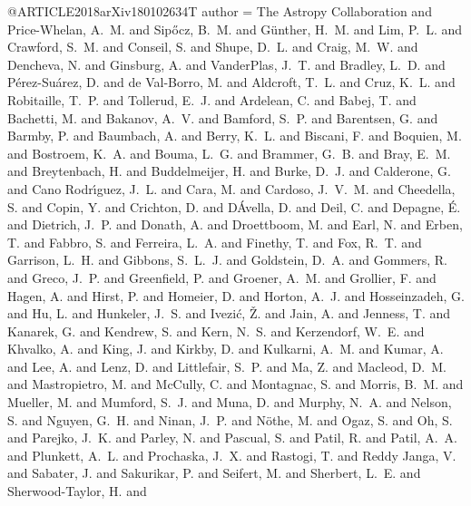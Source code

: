 @ARTICLE{2018arXiv180102634T
   author = {{The Astropy Collaboration} and {Price-Whelan}, A.~M. and {Sip{\H o}cz}, B.~M. and
        {G{\"u}nther}, H.~M. and {Lim}, P.~L. and {Crawford}, S.~M. and
        {Conseil}, S. and {Shupe}, D.~L. and {Craig}, M.~W. and {Dencheva}, N. and
        {Ginsburg}, A. and {VanderPlas}, J.~T. and {Bradley}, L.~D. and 
        {P{\'e}rez-Su{\'a}rez}, D. and {de Val-Borro}, M. and {Aldcroft}, T.~L. and 
        {Cruz}, K.~L. and {Robitaille}, T.~P. and {Tollerud}, E.~J. and
        {Ardelean}, C. and {Babej}, T. and {Bachetti}, M. and {Bakanov}, A.~V. and 
        {Bamford}, S.~P. and {Barentsen}, G. and {Barmby}, P. and {Baumbach}, A. and 
        {Berry}, K.~L. and {Biscani}, F. and {Boquien}, M. and {Bostroem}, K.~A. and 
        {Bouma}, L.~G. and {Brammer}, G.~B. and {Bray}, E.~M. and {Breytenbach}, H. and
        {Buddelmeijer}, H. and {Burke}, D.~J. and {Calderone}, G. and 
        {Cano Rodr{\'{\i}}guez}, J.~L. and {Cara}, M. and {Cardoso}, J.~V.~M. and 
        {Cheedella}, S. and {Copin}, Y. and {Crichton}, D. and {D{\'A}vella}, D. and
        {Deil}, C. and {Depagne}, {\'E}. and {Dietrich}, J.~P. and {Donath}, A. and 
        {Droettboom}, M. and {Earl}, N. and {Erben}, T. and {Fabbro}, S. and 
        {Ferreira}, L.~A. and {Finethy}, T. and {Fox}, R.~T. and {Garrison}, L.~H. and 
        {Gibbons}, S.~L.~J. and {Goldstein}, D.~A. and {Gommers}, R. and 
        {Greco}, J.~P. and {Greenfield}, P. and {Groener}, A.~M. and 
        {Grollier}, F. and {Hagen}, A. and {Hirst}, P. and {Homeier}, D. and 
        {Horton}, A.~J. and {Hosseinzadeh}, G. and {Hu}, L. and {Hunkeler}, J.~S. and 
        {Ivezi{\'c}}, {\v Z}. and {Jain}, A. and {Jenness}, T. and {Kanarek}, G. and 
        {Kendrew}, S. and {Kern}, N.~S. and {Kerzendorf}, W.~E. and 
        {Khvalko}, A. and {King}, J. and {Kirkby}, D. and {Kulkarni}, A.~M. and 
        {Kumar}, A. and {Lee}, A. and {Lenz}, D. and {Littlefair}, S.~P. and 
        {Ma}, Z. and {Macleod}, D.~M. and {Mastropietro}, M. and {McCully}, C. and 
        {Montagnac}, S. and {Morris}, B.~M. and {Mueller}, M. and {Mumford}, S.~J. and 
        {Muna}, D. and {Murphy}, N.~A. and {Nelson}, S. and {Nguyen}, G.~H. and 
        {Ninan}, J.~P. and {N{\"o}the}, M. and {Ogaz}, S. and {Oh}, S. and 
        {Parejko}, J.~K. and {Parley}, N. and {Pascual}, S. and {Patil}, R. and 
        {Patil}, A.~A. and {Plunkett}, A.~L. and {Prochaska}, J.~X. and 
        {Rastogi}, T. and {Reddy Janga}, V. and {Sabater}, J. and {Sakurikar}, P. and 
        {Seifert}, M. and {Sherbert}, L.~E. and {Sherwood-Taylor}, H. and 
}}
